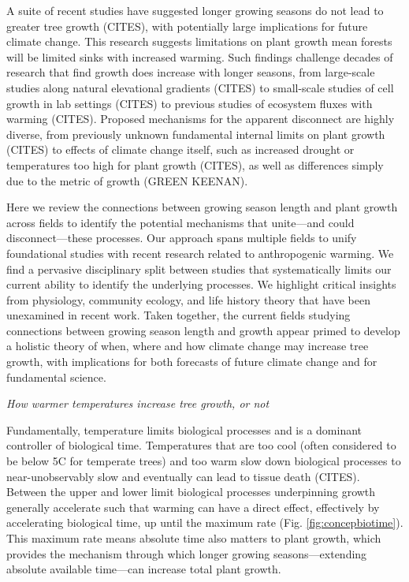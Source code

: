 \documentclass[11pt]{article}
\begin{document}
A suite of recent studies have suggested longer growing seasons do not lead to greater tree growth (CITES), with potentially large implications for future climate change. This research suggests limitations on plant growth mean forests will be limited sinks with increased warming. Such findings challenge decades of research that find growth does increase with longer seasons, from large-scale studies along natural elevational gradients (CITES) to small-scale studies of cell growth in lab settings (CITES) to previous studies of ecosystem fluxes with warming (CITES). Proposed mechanisms for the apparent disconnect are highly diverse, from previously unknown fundamental internal limits on plant growth (CITES) to effects of climate change itself, such as increased drought or temperatures too high for plant growth (CITES), as well as differences simply due to the metric of growth (GREEN KEENAN).

Here we review the connections between growing season length and plant growth across fields to identify the potential mechanisms that unite---and could disconnect---these processes. Our approach spans multiple fields to unify foundational studies with recent research related to anthropogenic warming. We find a pervasive disciplinary split between studies that systematically limits our current ability to identify the underlying processes. We highlight critical insights from physiology, community ecology, and life history theory that have been unexamined in recent work. Taken together, the current fields studying connections between growing season length and growth appear primed to develop a holistic theory of when, where and how climate change may increase tree growth, with implications for both forecasts of future climate change and for fundamental science.

\emph{How warmer temperatures increase tree growth, or not}

Fundamentally, temperature limits biological processes and is a dominant controller of biological time. Temperatures that are too cool (often considered to be below 5\degree C for temperate trees) and too warm \citep[an area of active research][, see also Fig. \ref{fig:temperaturecomplex}]{martinez2008hot,cabon2022cross} slow down biological processes to near-unobservably slow and eventually can lead to tissue death (CITES). Between the upper and lower limit biological processes underpinning growth generally accelerate such that warming can have a direct effect, effectively by accelerating biological time, up until the maximum rate (Fig. \ref{fig:concepbiotime}). This maximum rate means absolute time also matters to plant growth, which provides the mechanism through which longer growing seasons---extending absolute available time---can increase total plant growth. %
 
\end{document}
